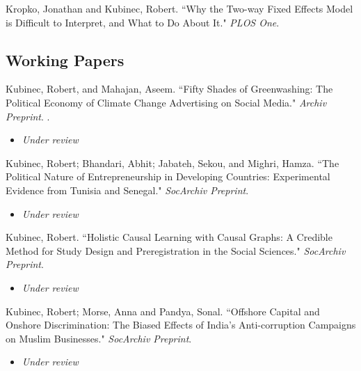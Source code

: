 \documentclass[11pt, a4paper]{article}
\newcommand{\years}[1]{\marginnote{\scriptsize #1}}
\begin{document}
\years{2020}Kropko, Jonathan and Kubinec, Robert. ``Why the Two-way Fixed Effects Model is Difficult to Interpret, and What to Do About It." \textit{PLOS One}. \\

\subsection*{Working Papers}
\noindent

\years{2026} Kubinec, Robert, and Mahajan, Aseem. ``Fifty Shades of Greenwashing: The Political Economy of Climate Change Advertising on Social Media." \emph{Archiv Preprint}. .\\

\begin{itemize}
	\item \emph{Under review}
\end{itemize}

\years{2025} Kubinec, Robert; Bhandari, Abhit; Jabateh, Sekou, and Mighri, Hamza. ``The Political Nature of Entrepreneurship in Developing Countries: Experimental Evidence from Tunisia and Senegal." \emph{SocArchiv Preprint}. \\

\begin{itemize}
	\item \emph{Under review}
\end{itemize}

\years{2024} Kubinec, Robert. ``Holistic Causal Learning with Causal Graphs: A Credible Method for Study Design and Preregistration in the Social Sciences." \emph{SocArchiv Preprint}. \\

\begin{itemize}
	\item \emph{Under review}
\end{itemize}

\years{2024} Kubinec, Robert; Morse, Anna and Pandya, Sonal. ``Offshore Capital and Onshore Discrimination: The Biased Effects of India's Anti-corruption Campaigns on Muslim Businesses." \emph{SocArchiv Preprint}. \\

\begin{itemize}
	\item \emph{Under review}
\end{itemize}
\end{document}
